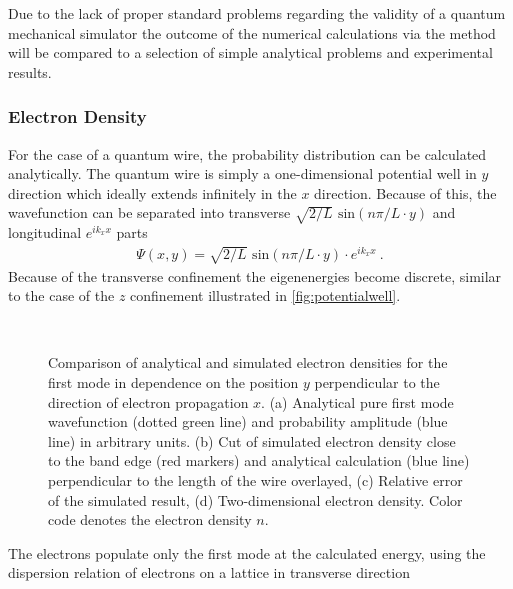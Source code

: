 Due to the lack of proper standard problems regarding the validity of a quantum mechanical simulator the outcome of the numerical calculations via the \gfnc{} method will be compared to a selection of simple analytical problems and experimental results.\par
\subsubsection{Electron Density}
For the case of a quantum wire, the probability distribution can be calculated analytically. The quantum wire is simply a one-dimensional potential well in $y$ direction which ideally extends infinitely in the $x$ direction.
Because of this, the wavefunction can be separated into transverse $\sqrt{2/L}\text{ sin}(n\pi/L \cdot y)$ and longitudinal $e^{ik_xx}$ parts
\begin{align}
\Psi(x,y) = \sqrt{2/L}\text{ sin}(n\pi/L \cdot y) \cdot e^{ik_xx}\ .
\end{align}
Because of the transverse confinement the eigenenergies become discrete, similar to the case of the $z$ confinement illustrated in \cref{fig:potentialwell}.
\begin{figure}[h!]
  \begin{center}
 \qquad
    \\
    \qquad
    \caption{Comparison of analytical and simulated electron densities for the first mode in dependence on the position $y$ perpendicular to the direction of electron propagation $x$. (a) Analytical pure first mode wavefunction (dotted green line) and probability amplitude (blue line) in arbitrary units. (b) Cut of simulated electron density close to the band edge (red markers) and analytical calculation (blue line) perpendicular to the length of the wire overlayed, (c) Relative error of the simulated result, (d) Two-dimensional electron density. Color code denotes the electron density $n$. }\label{fig:mode1}
  \end{center}
\end{figure}
The electrons populate only the first mode at the calculated energy, using the dispersion relation of electrons on a lattice in transverse direction
